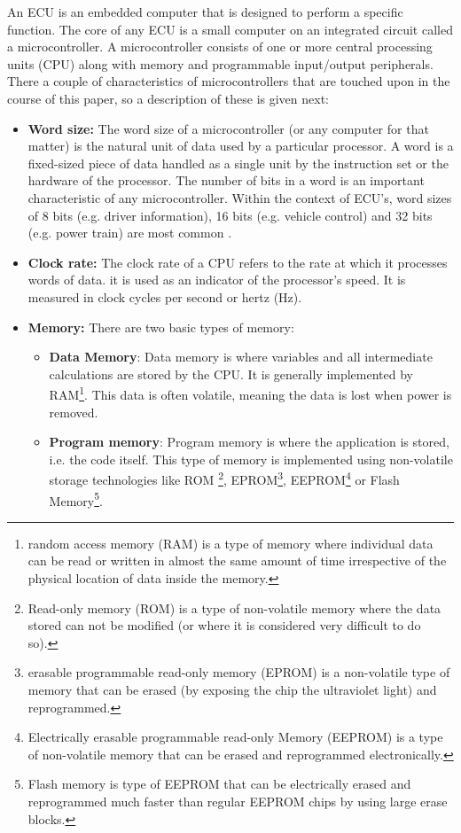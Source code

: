 An ECU is an embedded computer that is designed to perform a specific function. The core of any ECU is a small computer on an integrated circuit called a microcontroller. A microcontroller consists of one or more central processing units (CPU) along with memory and programmable input/output peripherals. There a couple of characteristics of microcontrollers that are touched upon in the course of this paper, so a description of these is given next:

\begin{itemize}
	\item \textbf{Word size:} The word size of a microcontroller (or any computer for that matter) is the natural unit of data used by a particular processor. A word is a fixed-sized piece of data handled as a single unit by the instruction set or the hardware of the processor. The number of bits in a word is an important characteristic of any microcontroller. Within the context of ECU's, word sizes of 8 bits (e.g. driver information), 16 bits (e.g. vehicle control) and 32 bits (e.g. power train) are most common \cite{ECU}.
	
	\item \textbf{Clock rate:} The clock rate of a CPU refers to the rate at which it processes words of data. it is used as an indicator of the processor's speed. It is measured in clock cycles per second or hertz (Hz). 
	
	\item \textbf{Memory:} There are two basic types of memory: 
	\begin{itemize}
		\item \textbf{Data Memory}: Data memory is where variables and all intermediate calculations are stored by the CPU. It is generally implemented by RAM\footnote{random access memory (RAM) is a type of memory where individual data can be read or written in almost the same amount of time irrespective of the physical location of data inside the memory.}. This data is often volatile, meaning the data is lost when power is removed.
		
		\item \textbf{Program memory}: Program memory is where the application is stored, i.e. the code itself. This type of memory is implemented using non-volatile storage technologies like ROM \footnote{Read-only memory (ROM) is a type of non-volatile memory where the data stored can not be modified (or where it is considered very difficult to do so).}, EPROM\footnote{erasable programmable read-only memory (EPROM) is a non-volatile type of memory that can be erased (by exposing the chip the ultraviolet light) and reprogrammed.}, EEPROM\footnote{Electrically erasable programmable read-only Memory (EEPROM) is a type of non-volatile memory that can be erased and reprogrammed electronically.} or Flash Memory\footnote{Flash memory is type of EEPROM  that can be electrically erased and reprogrammed much faster than regular EEPROM chips by using large erase blocks.}.
	\end{itemize}
	

\end{itemize}
